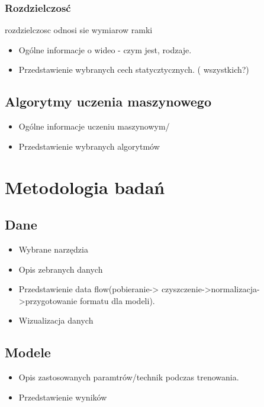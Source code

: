 \subsection{Rozdzielczosć}
rozdzielczosc odnosi sie wymiarow ramki 

\begin{itemize}
\item Ogólne informacje o wideo - czym jest, rodzaje.
\item Przedstawienie wybranych cech statycztycznych. ( wszystkich?) 
\end{itemize}


\section{Algorytmy uczenia maszynowego }
\label{cha:pierwszyDokument}

\begin{itemize}
\item Ogólne informacje uczeniu maszynowym/
\item Przedstawienie wybranych algorytmów 
\end{itemize}

\chapter{Metodologia badań}
\label{cha:pierwszyDokument}

\section{Dane}
\label{cha:pierwszyDokument}

\begin{itemize}
\item Wybrane narzędzia
\item Opis zebranych danych
\item Przedstawienie data flow(pobieranie-> czyszczenie->normalizacja->przygotowanie formatu dla modeli).
\item Wizualizacja danych
\end{itemize}


\section{Modele }
\label{cha:pierwszyDokument}

\begin{itemize}
\item Opis zastosowanych paramtrów/technik podczas trenowania.
\item Przedstawienie wyników 
\end{itemize}


